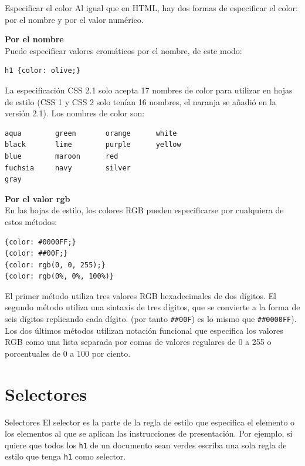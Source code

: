\begin{frame}{Especificar el color} %
    Al igual que en HTML, hay dos formas de especificar el color: por el nombre
    y por el valor numérico. 

    \textbf{Por el nombre}\\[0.2cm]
    Puede especificar valores cromáticos por el nombre, de este modo: 

    \begin{lstlisting}
h1 {color: olive;}
    \end{lstlisting}
    
    La especificación CSS 2.1 solo acepta 17 nombres de color para utilizar en
    hojas de estilo (CSS 1 y CSS 2 solo tenían 16 nombres, el naranja se añadió
    en la versión 2.1). Los nombres de color son: 
    \begin{verbatim}
aqua        green       orange      white
black       lime        purple      yellow
blue        maroon      red 
fuchsia     navy        silver 
gray        
    \end{verbatim}

    \textbf{Por el valor rgb} \\[0.2cm]
    En las hojas de estilo, los colores RGB pueden especificarse por cualquiera
    de estos métodos: 

    \begin{lstlisting}
{color: #0000FF;}
{color: ##00F;}
{color: rgb(0, 0, 255);}
{color: rgb(0%, 0%, 100%)}
    \end{lstlisting}

    El primer método utiliza tres valores RGB hexadecimales de dos dígitos. El
    segundo método utiliza una sintaxis de tres dígitos,  que se convierte a la
    forma de seis dígitos replicando cada dígito. (por tanto \texttt{\#\#00F})
    es lo mismo que \texttt{\#\#0000FF}).
    Los dos últimos métodos utilizan notación funcional que especifica los
    valores RGB como una lista separada por comas de valores regulares de 0 a
    255 o porcentuales de 0 a 100 por ciento. 

\end{frame}


\section{Selectores}

\begin{frame}{Selectores} %
    El selector es la parte de la regla de estilo que especifica el elemento o
    los elementos al que se aplican las instrucciones de presentación. Por
    ejemplo, si quiere que todos los \texttt{h1} de un documento sean verdes
    escriba una sola regla de estilo que tenga \texttt{h1} como selector. 
\end{frame}

